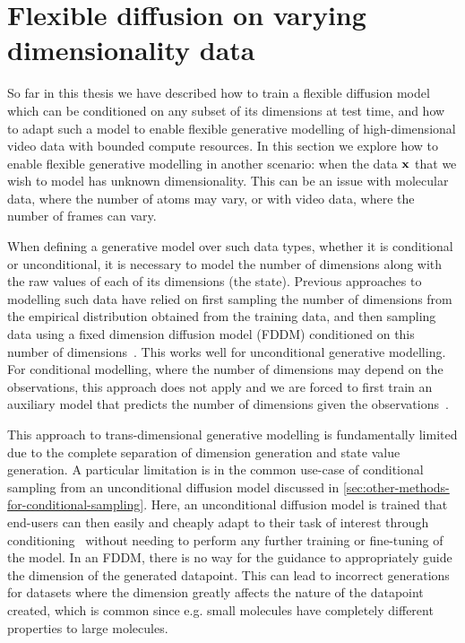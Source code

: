 \newtheorem{proposition}{Proposition}
\newtheorem{lemma}{Lemma}
\newtheorem{assumption}{Assumption}

\chapter{Flexible diffusion on varying dimensionality data}
\label{ch:tddm}

So far in this thesis we have described how to train a flexible diffusion model which can be conditioned on any subset of its dimensions at test time, and how to adapt such a model to enable flexible generative modelling of high-dimensional video data with bounded compute resources. In this section we explore how to enable flexible generative modelling in another scenario: when the data ${\mathbf{x}}$ that we wish to model has unknown dimensionality. This can be an issue with molecular data, where the number of atoms may vary, or with video data, where the number of frames can vary. 

When defining a generative model over such data types, whether it is conditional or unconditional, it is necessary to model the number of dimensions along with the raw values of each of its dimensions (the state). Previous approaches to modelling such data have relied on first sampling the number of dimensions from the empirical distribution obtained from the training data, and then sampling data using a fixed dimension diffusion model (FDDM) conditioned on this number of dimensions~\cite{hoogeboom2022equivariant}. This works well for unconditional generative modelling. For conditional modelling, where the number of dimensions may depend on the observations, this approach does not apply and we are forced to first train an auxiliary model that predicts the number of dimensions given the observations~\cite{igashov2022equivariant}.

This approach to trans-dimensional generative modelling is fundamentally limited due to the complete separation of dimension generation and state value generation. A particular limitation is in the common use-case of conditional sampling from an unconditional diffusion model discussed in \cref{sec:other-methods-for-conditional-sampling}. Here, an unconditional diffusion model is trained that end-users can then easily and cheaply adapt to their task of interest through conditioning~\cite{song2020score, dhariwal2021diffusion, clip_guided_diffusion, zhang2023towards} without needing to perform any further training or fine-tuning of the model. In an FDDM, there is no way for the guidance to appropriately guide the dimension of the generated datapoint. This can lead to incorrect generations for datasets where the dimension greatly affects the nature of the datapoint created, which is common since e.g. small molecules have completely different properties to large molecules.

